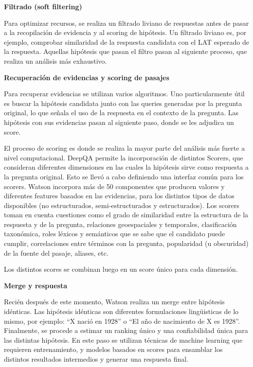 \textbf{Filtrado (soft filtering)}\newline


Para optimizar recursos, se realiza un filtrado liviano de respuestas
antes de pasar a la recopilación de evidencia y al scoring de
hipótesis. Un filtrado liviano es, por ejemplo, comprobar similaridad
de la respuesta candidata con el LAT esperado de la respuesta. Aquellas
hipótesis que pasan el filtro pasan al siguiente proceso, que realiza
un análisis más exhaustivo. \newline 

\textbf{Recuperación de evidencias y scoring de pasajes}\newline

Para recuperar evidencias se utilizan varios algoritmos. Uno
particularmente útil es buscar la hipótesis candidata junto con las
queries generadas por la pregunta original, lo que señala el uso de
la respuesta en el contexto de la pregunta.  Las hipótesis con sus
evidencias pasan al siguiente paso, donde se les adjudica un score. 

El proceso de scoring es donde se realiza la mayor parte del análisis
más fuerte a nivel computacional. DeepQA permite la incorporación
de distintos Scorers, que consideran diferentes dimensiones en las
cuales la hipótesis sirve como respuesta a la pregunta original. Esto
se llevó a cabo definiendo una interfaz común para los scorers.
Watson incorpora más de 50 componentes que producen valores y
diferentes features basados en las evidencias, para los distintos tipos
de datos disponibles (no estructurados, semi-estructurados y
estructurados). Los scorers toman en cuenta cuestiones como el grado de
similaridad entre la estructura de la respuesta y de la pregunta,
relaciones geoespaciales y temporales, clasificación taxonómica,
roles léxicos y semánticos que se sabe que el candidato puede
cumplir, correlaciones entre términos con la pregunta, popularidad (u
obscuridad) de la fuente del pasaje, aliases, etc.

Los distintos scores se combinan luego en un score único para cada
dimensión. \newline 

\textbf{Merge y respuesta}\newline

Recién después de este momento, Watson realiza un merge entre
hipótesis idénticas. Las hipótesis idénticas son diferentes
formulaciones ling\"uisticas de lo mismo, por ejemplo:
{\textquotedblleft}X nació en 1928{\textquotedblright} o
{\textquotedblleft}El año de nacimiento de X es
1928{\textquotedblright}. Finalmente, se procede a estimar un ranking
único y una confiabilidad única para las distintas hipótesis. En
este paso se utilizan técnicas de machine learning que requieren
entrenamiento, y modelos basados en scores para ensamblar los distintos
resultados intermedios y generar una respuesta final.


